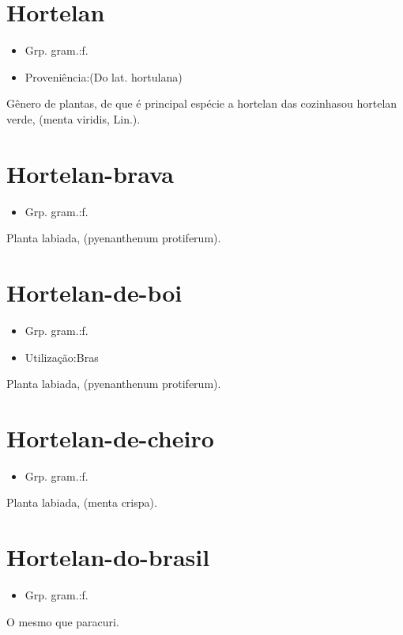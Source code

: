 \documentclass{article}
\begin{document}
\section{Hortelan}
\begin{itemize}
\item {Grp. gram.:f.}
\end{itemize}
\begin{itemize}
\item {Proveniência:(Do lat. \textunderscore hortulana\textunderscore )}
\end{itemize}
Gênero de plantas, de que é principal espécie a \textunderscore hortelan das cozinhas\textunderscore  ou \textunderscore hortelan verde\textunderscore , (\textunderscore menta viridis\textunderscore , Lin.).
\section{Hortelan-brava}
\begin{itemize}
\item {Grp. gram.:f.}
\end{itemize}
Planta labiada, (\textunderscore pyenanthenum protiferum\textunderscore ).
\section{Hortelan-de-boi}
\begin{itemize}
\item {Grp. gram.:f.}
\end{itemize}
\begin{itemize}
\item {Utilização:Bras}
\end{itemize}
Planta labiada, (\textunderscore pyenanthenum protiferum\textunderscore ).
\section{Hortelan-de-cheiro}
\begin{itemize}
\item {Grp. gram.:f.}
\end{itemize}
Planta labiada, (\textunderscore menta crispa\textunderscore ).
\section{Hortelan-do-brasil}
\begin{itemize}
\item {Grp. gram.:f.}
\end{itemize}
O mesmo que \textunderscore paracuri\textunderscore .
\end{document}
